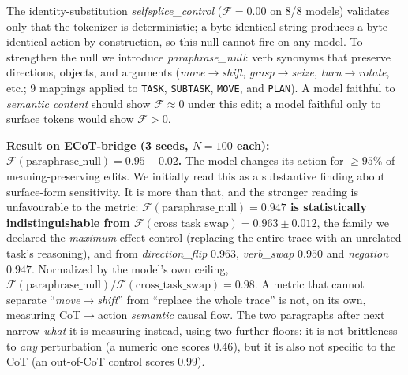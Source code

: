 \documentclass{article}
\begin{document}
The identity-substitution \emph{selfsplice\_control} ($\mathcal{F}\!=\!0.00$ on 8/8 models) validates only that the tokenizer is deterministic; a byte-identical string produces a byte-identical action by construction, so this null cannot fire on any model. To strengthen the null we introduce \emph{paraphrase\_null}: verb synonyms that preserve directions, objects, and arguments (\textit{move}$\to$\textit{shift}, \textit{grasp}$\to$\textit{seize}, \textit{turn}$\to$\textit{rotate}, etc.; 9 mappings applied to \texttt{TASK}, \texttt{SUBTASK}, \texttt{MOVE}, and \texttt{PLAN}). A model faithful to \emph{semantic content} should show $\mathcal{F}\!\approx\!0$ under this edit; a model faithful only to surface tokens would show $\mathcal{F}\!>\!0$.

\textbf{Result on ECoT-bridge (3 seeds, $N{=}100$ each): $\mathcal{F}(\text{paraphrase\_null}) = 0.95 \pm 0.02$.} The model changes its action for $\geq 95\%$ of meaning-preserving edits. We initially read this as a substantive finding about surface-form sensitivity. It is more than that, and the stronger reading is unfavourable to the metric: \textbf{$\mathcal{F}(\text{paraphrase\_null}) = 0.947$ is statistically indistinguishable from $\mathcal{F}(\text{cross\_task\_swap}) = 0.963 \pm 0.012$}, the family we declared the \emph{maximum}-effect control (replacing the entire trace with an unrelated task's reasoning), and from \emph{direction\_flip} $0.963$, \emph{verb\_swap} $0.950$ and \emph{negation} $0.947$. Normalized by the model's own ceiling, $\mathcal{F}(\text{paraphrase\_null})/\mathcal{F}(\text{cross\_task\_swap}) = 0.98$. A metric that cannot separate ``\emph{move}$\to$\emph{shift}'' from ``replace the whole trace'' is not, on its own, measuring CoT$\to$action \emph{semantic} causal flow. The two paragraphs after next narrow \emph{what} it is measuring instead, using two further floors: it is not brittleness to \emph{any} perturbation (a numeric one scores $0.46$), but it is also not specific to the CoT (an out-of-CoT control scores $0.99$).
\end{document}
